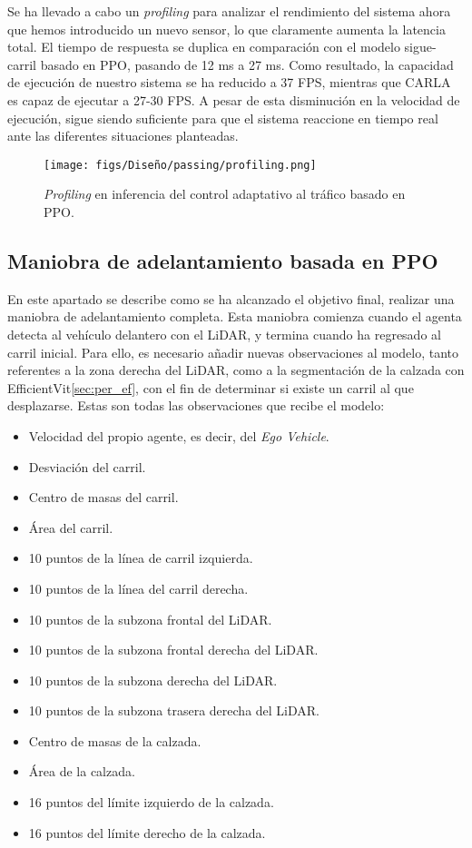 Se ha llevado a cabo un \textit{profiling} para analizar el rendimiento del sistema ahora que hemos introducido un nuevo sensor, lo que claramente aumenta la latencia total. El tiempo de respuesta se duplica en comparación con el modelo sigue-carril basado en \ac{PPO}, pasando de 12 ms a 27 ms. Como resultado, la capacidad de ejecución de nuestro sistema se ha reducido a 37 \ac{FPS}, mientras que CARLA es capaz de ejecutar a 27-30 \ac{FPS}. A pesar de esta disminución en la velocidad de ejecución, sigue siendo suficiente para que el sistema reaccione en tiempo real ante las diferentes situaciones planteadas.

\begin{figure}[ht]
\centering
\texttt{[image: figs/Diseño/passing/profiling.png]}
\caption{\textit{Profiling} en inferencia del control adaptativo al tráfico basado en \ac{PPO}.}
\label{fig:profiling_ppo_passing}
\end{figure}

\subsection{Maniobra de adelantamiento basada en PPO}

En este apartado se describe como se ha alcanzado el objetivo final, realizar una maniobra de adelantamiento completa. Esta maniobra comienza cuando el agenta detecta al vehículo delantero con el \ac{LiDAR}, y termina cuando ha regresado al carril inicial. Para ello, es necesario añadir nuevas observaciones al modelo, tanto referentes a la zona derecha del \ac{LiDAR}, como a la segmentación de la calzada con EfficientVit\ref{sec:per_ef}, con el fin de determinar si existe un carril al que desplazarse. Estas son todas las observaciones que recibe el modelo:
\begin{itemize}
\item Velocidad del propio agente, es decir, del \textit{Ego Vehicle}.
\item Desviación del carril.
\item Centro de masas del carril.
\item Área del carril.
\item 10 puntos de la línea de carril izquierda.
\item 10 puntos de la línea del carril derecha.
\item 10 puntos de la subzona frontal del \ac{LiDAR}.
\item 10 puntos de la subzona frontal derecha del \ac{LiDAR}.
\item 10 puntos de la subzona derecha del \ac{LiDAR}.
\item 10 puntos de la subzona trasera derecha del \ac{LiDAR}.
\item Centro de masas de la calzada.
\item Área de la calzada.
\item 16 puntos del límite izquierdo de la calzada.
\item 16 puntos del límite derecho de la calzada.
\end{itemize}

